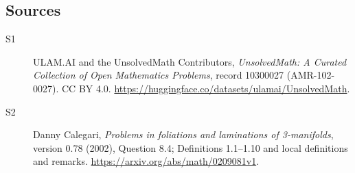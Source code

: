 \documentclass[11pt]{article}
\begin{document}
\subsection{Sources}
\begin{description}
\item[\hypertarget{source:10300027:1}{S1}] ULAM.AI and the UnsolvedMath Contributors, \emph{UnsolvedMath: A Curated Collection of Open Mathematics Problems}, record 10300027 (AMR-102-0027). CC BY 4.0. \url{https://huggingface.co/datasets/ulamai/UnsolvedMath}.
\item[\hypertarget{source:10300027:2}{S2}] Danny Calegari, \emph{Problems in foliations and laminations of 3-manifolds}, version 0.78 (2002), Question 8.4; Definitions 1.1--1.10 and local definitions and remarks. \url{https://arxiv.org/abs/math/0209081v1}.
\end{description}
\label{end:10300027}
\end{document}
